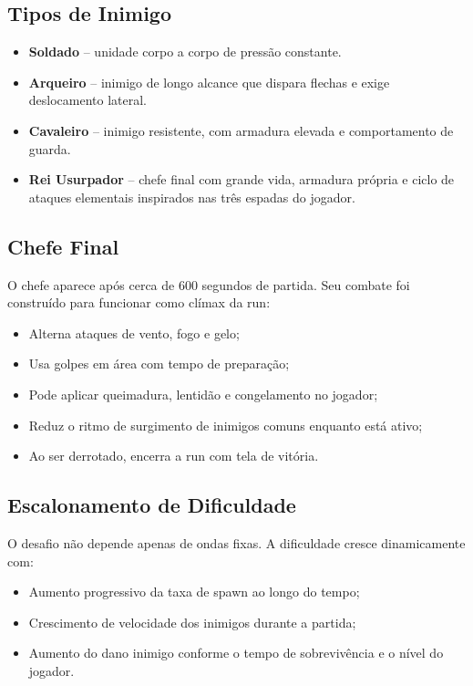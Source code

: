 \documentclass[a4paper,12pt]{article}
\begin{document}
\subsection*{Tipos de Inimigo}

\begin{itemize}
    \item \textbf{Soldado} -- unidade corpo a corpo de pressão constante.
    \item \textbf{Arqueiro} -- inimigo de longo alcance que dispara flechas e exige deslocamento lateral.
    \item \textbf{Cavaleiro} -- inimigo resistente, com armadura elevada e comportamento de guarda.
    \item \textbf{Rei Usurpador} -- chefe final com grande vida, armadura própria e ciclo de ataques elementais inspirados nas três espadas do jogador.
\end{itemize}

\subsection*{Chefe Final}

O chefe aparece após cerca de 600 segundos de partida. Seu combate foi construído para funcionar como clímax da run:

\begin{itemize}
    \item Alterna ataques de vento, fogo e gelo;
    \item Usa golpes em área com tempo de preparação;
    \item Pode aplicar queimadura, lentidão e congelamento no jogador;
    \item Reduz o ritmo de surgimento de inimigos comuns enquanto está ativo;
    \item Ao ser derrotado, encerra a run com tela de vitória.
\end{itemize}

\subsection*{Escalonamento de Dificuldade}

O desafio não depende apenas de ondas fixas. A dificuldade cresce dinamicamente com:

\begin{itemize}
    \item Aumento progressivo da taxa de spawn ao longo do tempo;
    \item Crescimento de velocidade dos inimigos durante a partida;
    \item Aumento do dano inimigo conforme o tempo de sobrevivência e o nível do jogador.
\end{itemize}
\end{document}
